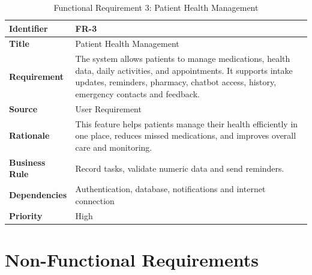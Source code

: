\documentclass[12pt, a4paper, oneside]{report}
\begin{document}
\begin{table}[H]
\centering
\caption{Functional Requirement 3: Patient Health Management}
\begin{tabularx}{\textwidth}{|l|X|}
\hline
\textbf{Identifier} & FR-3 \\ \hline
\textbf{Title} & Patient Health Management \\ \hline
\textbf{Requirement} & The system allows patients to manage medications, health data, daily activities, and appointments. It supports intake updates, reminders, pharmacy, chatbot access, history, emergency contacts and feedback. \\ \hline
\textbf{Source} & User Requirement \\ \hline
\textbf{Rationale} & This feature helps patients manage their health efficiently in one place, reduces missed medications, and improves overall care and monitoring. \\ \hline
\textbf{Business Rule} & Record tasks, validate numeric data and send reminders. \\ \hline
\textbf{Dependencies} & Authentication, database, notifications and internet connection \\ \hline
\textbf{Priority} & High \\ \hline
\end{tabularx}
\end{table}



\section{Non-Functional Requirements}
\label{sec:non-functional-req}
\end{document}
